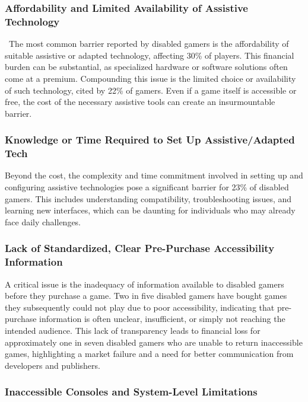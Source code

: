 \subsubsection{Affordability and Limited Availability of Assistive Technology}
\
The most common barrier reported by disabled gamers is the affordability of suitable assistive or adapted technology, affecting 30\% of players\supercite{ScopeGamingReport}. This financial burden can be substantial, as specialized hardware or software solutions often come at a premium. Compounding this issue is the limited choice or availability of such technology, cited by 22\% of gamers\supercite{ScopeGamingReport}. Even if a game itself is accessible or free, the cost of the necessary assistive tools can create an insurmountable barrier.

\subsubsection{Knowledge or Time Required to Set Up Assistive/Adapted Tech}

Beyond the cost, the complexity and time commitment involved in setting up and configuring assistive technologies pose a significant barrier for 23\% of disabled gamers\supercite{ScopeGamingReport}. This includes understanding compatibility, troubleshooting issues, and learning new interfaces, which can be daunting for individuals who may already face daily challenges.

\subsubsection{Lack of Standardized, Clear Pre-Purchase Accessibility Information}

A critical issue is the inadequacy of information available to disabled gamers before they purchase a game. Two in five disabled gamers have bought games they subsequently could not play due to poor accessibility, indicating that pre-purchase information is often unclear, insufficient, or simply not reaching the intended audience\supercite{ScopeGamingReport}. This lack of transparency leads to financial loss for approximately one in seven disabled gamers who are unable to return inaccessible games, highlighting a market failure and a need for better communication from developers and publishers\supercite{ScopeGamingReport}.

\subsubsection{Inaccessible Consoles and System-Level Limitations}

